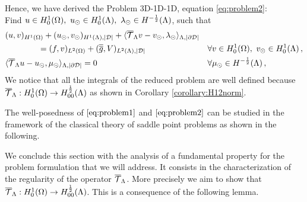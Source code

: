 \documentclass[r]{siamart171218}
\begin{document}
Hence, we have derived the Problem 3D-1D-1D, equation \eqref{eq:problem2}: \\ 
Find $u \in H^1_0(\Omega),\ u_{\odot} \in H^1_0(\Lambda), \ \lambda_{\odot} \in H^{-\frac12}(\Lambda)$, such that
\begin{subequations}
\begin{align*}
&(u,v)_{H^1(\Omega)} + (u_{\odot},v_{\odot})_{H^1(\Lambda),|\mathcal{D}|} 
+  \langle {\overline{\mathcal{T}}_\Lambda} v - v_{\odot}, \lambda_{\odot} \rangle_{\Lambda, |\partial\mathcal{D}|} &&
\\
\nonumber
&\qquad\qquad= (f,v)_{L^2(\Omega)} +  (\overline{\overline{g}},V)_{L^2(\Lambda),|\mathcal{D}|}
\quad && \forall v \in H^1_0(\Omega), \ v_{\odot} \in H^1_0(\Lambda)\,,
\\
& \langle {\overline{\mathcal{T}}_\Lambda} u -   u_{\odot}, \mu_{\odot} \rangle_{\Lambda,|\partial\mathcal{D}|} = 0
\quad &&\forall \mu_{\odot} \in H^{-\frac12}(\Lambda)\,,
\end{align*}
\end{subequations}
We notice that all the integrals of the reduced problem are well defined because 
${\overline{\mathcal{T}}_\Lambda}: H^1_0(\Omega) \rightarrow H^\frac12_{00}(\Lambda)$ as shown in Corollary \ref{corollary:H12norm}.

The well-posedness of $\eqref{eq:problem1}$ and $\eqref{eq:problem2}$ 
can be studied in the framework of the classical theory of saddle point problems as shown in the following.


We conclude this section with the analysis of a fundamental property for the problem formulation that we will address.
It consists in the characterization of the regularity of the operator ${\overline{\mathcal{T}}_\Lambda}$.
More precisely we aim to show that ${\overline{\mathcal{T}}_\Lambda}: H^1_0(\Omega) \rightarrow H^\frac12_{00}(\Lambda)$.
This is a consequence of the following lemma.







%












\appendix

\end{document}
